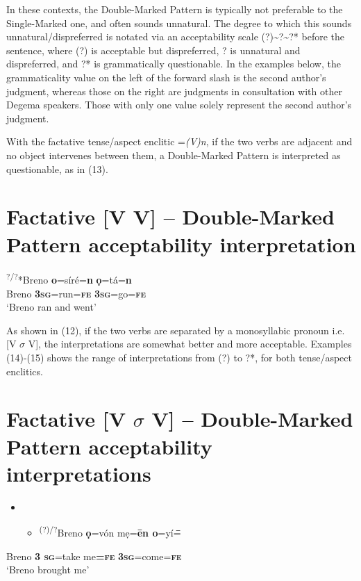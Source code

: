 In these contexts, the Double-Marked Pattern is typically not preferable to the Single-Marked one, and often sounds unnatural. The degree to which this sounds unnatural/dispreferred is notated via an acceptability scale (?){\textasciitilde}?{\textasciitilde}?* before the sentence, where (?) is acceptable but dispreferred, ? is unnatural and dispreferred, and ?* is grammatically questionable. In the examples below, the grammaticality value on the left of the forward slash is the second author’s judgment, whereas those on the right are judgments in consultation with other Degema speakers. Those with only one value solely represent the second author’s judgment.

With the factative tense/aspect enclitic =\textit{(V)n}, if the two verbs are adjacent and no object intervenes between them, a Double-Marked Pattern is interpreted as questionable, as in (13). 

\chapter[Factative [V V{]} – Double{}-Marked Pattern acceptability interpretation]{Factative [V V] – Double-Marked Pattern acceptability interpretation}
\label{bkm:Ref448214686}\gll \textsuperscript{?/?}*Breno   \textbf{o}=síré=\textbf{n}     \textbf{ọ}=tá=\textbf{n}\\
     Breno  \textbf{\textsc{3sg}}=run=\textbf{\textsc{fe  }}  \textbf{\textsc{3sg}}=go=\textbf{\textsc{fe}}\\
\glt ‘Breno ran and went’
\z

As shown in (12), if the two verbs are separated by a monosyllabic pronoun i.e. [V $\sigma $ V], the interpretations are somewhat better and more acceptable. Examples (14){}-(15) shows the range of interpretations from (?) to ?*, for both tense/aspect enclitics.

\chapter[Factative [V $\sigma $ V{]} – Double{}-Marked Pattern acceptability interpretations ]{Factative [V $\sigma $ V] – Double-Marked Pattern acceptability interpretations }
\label{bkm:Ref448215151}\begin{itemize}
\item \setcounter{itemize}{0}
\begin{itemize}
\item \gll \textsuperscript{   (?)/?}Breno  \textbf{ọ}=vón  mẹ=\textbf{\=en  o}=yí=\textbf{\=\in}\\
\end{itemize}
\end{itemize}
         Breno  \textbf{\textsc{3  sg}}=take  me\textbf{=}\textbf{\textsc{fe}}\textbf{  }\textbf{\textsc{3sg}}=come=\textbf{\textsc{fe}}\\
\glt ‘Breno brought me’
\z

